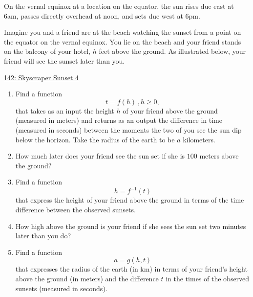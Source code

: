 \documentclass{ximera}
\begin{document}
\begin{question} \label{Q6:RightTriangle6}
On the vernal equinox at a location on the equator, the sun rises due east at 6am, passes directly overhead at noon, and sets due west at 6pm. 

Imagine you and a friend are at the beach watching the sunset from a point on the equator on the vernal equinox. You lie on the beach and your friend stands on the balcony of your hotel, $h$ feet above the ground. As illustrated below, your friend will see the sunset later than you. 


\begin{onlineOnly}
    \begin{center}
\end{center}
\end{onlineOnly}

\href{https://www.desmos.com/calculator/y8ijqldt5y}{142: Skyscraper Sunset 4}

\begin{enumerate}
\item Find a function
\[
   t = f(h) \, , h\geq 0 ,
\]
that takes as an input the height $h$ of your friend above the ground (measured in meters) and returns as an output the difference in time (measured in seconds) between the moments the two of you see the sun dip below the horizon. Take the radius of the earth to be $a$ kilometers.

\item How much later does your friend see the sun set if she is $100$ meters above the ground?

\item Find a function 
\[
   h = f^{-1}(t)
\]
that express the height of your friend above the ground in terms of the time difference between the observed sunsets. %

\item How high above the ground is your friend if she sees the sun set two minutes later than you do?

\item Find a function
\[
     a = g(h,t)
\]
that expresses the radius of the earth (in km) in terms of your friend's height above the ground (in meters) and the difference $t$ in the times of the observed sunsets (measured in seconds).
\end{enumerate}



\end{question}
\end{document}

